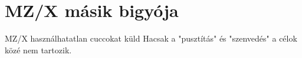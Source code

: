 \section{MZ/X másik bigyója}
\begin{tetel}{MZ/X használhatatlan cuccokat küld}
Hacsak a "pusztítás" és "szenvedés" a célok közé nem tartozik.
\end{tetel}
